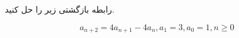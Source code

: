 \exercise
رابطه بازگشتی زیر را حل کنید.

$$a_{n+2} = 4a_{n+1} - 4a_{n}, a_1 = 3, a_0 = 1, n \geq 0$$